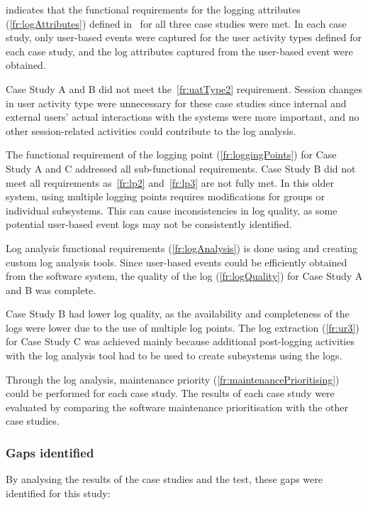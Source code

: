  indicates that the functional requirements for the logging attributes (\ref{fr:logAttributes}) defined in~ for all three case studies were met. In each case study, only user-based events were captured for the user activity types defined for each case study, and the log attributes captured from the user-based event were obtained. \par Case Study A and B did not meet the~\ref{fr:uatType2} requirement. Session changes in user activity type were unnecessary for these case studies since internal and external users' actual interactions with the systems were more important, and no other session-related activities could contribute to the log analysis. \par The functional requirement of the logging point (\ref{fr:loggingPoints}) for Case Study A and C addressed all sub-functional requirements. Case Study B did not meet all requirements as~\ref{fr:lp2} and~\ref{fr:lp3} are not fully met. In this older system, using multiple logging points requires modifications for groups or individual subsystems. This can cause inconsistencies in log quality, as some potential user-based event logs may not be consistently identified. \par Log analysis functional requirements (\ref{fr:logAnalysis}) is done using and creating custom log analysis tools. Since user-based events could be efficiently obtained from the software system, the quality of the log (\ref{fr:logQuality}) for Case Study A and B was complete. \par Case Study B had lower log quality, as the availability and completeness of the logs were lower due to the use of multiple log points. The log extraction (\ref{fr:ur3}) for Case Study C was achieved mainly because additional post-logging activities with the log analysis tool had to be used to create subsystems using the logs.\par Through the log analysis, maintenance priority (\ref{fr:maintenancePrioritising}) could be performed for each case study. The results of each case study were evaluated by comparing the software maintenance prioritisation with the other case studies.

\subsubsection{Gaps identified}
By analysing the results of the case studies and the test, these gaps were identified for this study:

